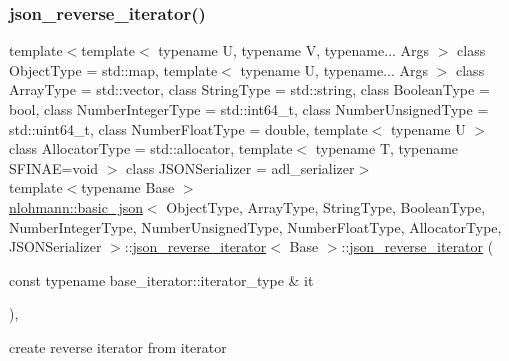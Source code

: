 \subsubsection{\texorpdfstring{json\_reverse\_iterator()}{json\_reverse\_iterator()}\hspace{0.1cm}{\footnotesize\ttfamily [1/2]}}
{\footnotesize\ttfamily template$<$template$<$ typename U, typename V, typename... Args $>$ class Object\+Type = std\+::map, template$<$ typename U, typename... Args $>$ class Array\+Type = std\+::vector, class String\+Type  = std\+::string, class Boolean\+Type  = bool, class Number\+Integer\+Type  = std\+::int64\+\_\+t, class Number\+Unsigned\+Type  = std\+::uint64\+\_\+t, class Number\+Float\+Type  = double, template$<$ typename U $>$ class Allocator\+Type = std\+::allocator, template$<$ typename T, typename S\+F\+I\+N\+A\+E=void $>$ class J\+S\+O\+N\+Serializer = adl\+\_\+serializer$>$ \\
template$<$typename Base $>$ \\
\mbox{\hyperlink{classnlohmann_1_1basic__json}{nlohmann\+::basic\+\_\+json}}$<$ Object\+Type, Array\+Type, String\+Type, Boolean\+Type, Number\+Integer\+Type, Number\+Unsigned\+Type, Number\+Float\+Type, Allocator\+Type, J\+S\+O\+N\+Serializer $>$\+::\mbox{\hyperlink{classnlohmann_1_1basic__json_1_1json__reverse__iterator}{json\+\_\+reverse\+\_\+iterator}}$<$ Base $>$\+::\mbox{\hyperlink{classnlohmann_1_1basic__json_1_1json__reverse__iterator}{json\+\_\+reverse\+\_\+iterator}} (\begin{DoxyParamCaption}\item[{const typename base\+\_\+iterator\+::iterator\+\_\+type \&}]{it }\end{DoxyParamCaption})\hspace{0.3cm}{\ttfamily [inline]}, {\ttfamily [noexcept]}}



create reverse iterator from iterator 

\mbox{\label{classnlohmann_1_1basic__json_1_1json__reverse__iterator_af04099cd32946ab37cfa6004ad5a7863}} 
